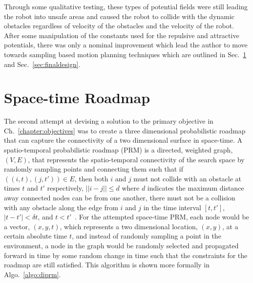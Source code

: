 Through some qualitative testing, these types of potential fields were still
leading the robot into unsafe areas and caused the robot to collide with the
dynamic obstacles regardless of velocity of the obstacles and the velocity of
the robot. After some manipulation of the constants used for the repulsive and
attractive potentials, there was only a nominal improvement which lead the
author to move towards sampling based motion planning techniques which are
outlined in Sec.~\ref{sec:stroadmap} and Sec.~\ref{sec:finaldesign}.

\section{Space-time Roadmap}

\label{sec:stroadmap}

The second attempt at devising a solution to the primary objective in
Ch.~\ref{chapter:objectives} was to create a three dimensional probabilistic
roadmap that can capture the connectivity of a two dimensional surface in
space-time. A spatio-temporal probabilistic roadmap (PRM) is a directed,
weighted graph, $(V, E)$, that represents the spatio-temporal connectivity of
the search space by randomly sampling points and connecting them such that if
$((i, t), (j, t')) \in E$, then both $i$ and $j$ must not collide with an
obstacle at times $t$ and $t'$ respectively, $||i - j|| \leq d$ where $d$
indicates the maximum distance away connected nodes can be from one another,
there must not be a collision with any obstacle along the edge from $i$ and $j$
in the time interval $[t, t']$, $|t - t'| < \delta t$, and $t < t'$~\cite{prm,
stprm}.  For the attempted space-time PRM, each node would be a vector, $(x, y,
t)$, which represents a two dimensional location, $(x, y)$, at a certain
absolute time $t$, and instead of randomly sampling a point in the environment,
a node in the graph would be randomly selected and propagated forward in time
by some random change in time such that the constraints for the roadmap are
still satisfied.  This algorithm is shown more formally in
Algo.~\ref{algo:diprm}.

